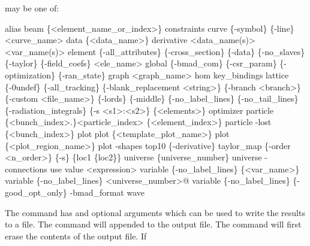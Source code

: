 {{ may be one of:
\begin{example}
   alias
   beam \{<element_name_or_index>\}
   constraints
   curve \{-symbol\} \{-line\} <curve_name> 
   data \{<data_name>\} 
   derivative <data_name(s)> <var_name(s)>
   element \{-all_attributes\} \{-cross_section\} \{-data\} \{-no_slaves\} 
         \{-taylor\} \{-field_coefs\} <ele_name>
   global \{-bmad_com\} \{-csr_param\} \{-optimization\} \{-ran_state\} 
   graph <graph_name>
   hom
   key_bindings
   lattice \{-0undef\} \{-all_tracking\} \{-blank_replacement <string>\} 
         \{-branch <branch>\} \{-custom <file_name>\} \{-lords\} \{-middle\} 
         \{-no_label_lines\} \{-no_tail_lines\} \{-radiation_integrals\}
         \{-s <s1>:<s2>\} \{<elements>\} 
   optimizer
   particle \{<bunch_index>.\}<particle_index> \{<element_index>\}
   particle -lost \{<bunch_index>\}
   plot
   plot \{<template_plot_name>\}
   plot \{<plot_region_name>\}
   plot -shapes
   top10 \{-derivative\}
   taylor_map \{-order <n_order>\} \{-s\} \{loc1 \{loc2\}\}
   universe \{universe_number\}
   universe -connections
   use
   value <expression>
   variable \{-no_label_lines\} \{<var_name>\}
   variable \{-no_label_lines\} <universe_number>@
   variable \{-no_label_lines\} \{-good_opt_only\} -bmad_format
   wave
\end{example}

\vskip 0.2in The  command has  and 
optional arguments which can be used to write the results to a file.
The  command will appended to the output file. The
 command will first erase the contents of the output
file. If \vn{global%
digit number is substituted for the \vn{*}. The value of the number
starts at \vn{001} and increases by 1 each time \vn{show -write} is
used.  Example:
\begin{example}
  show -write orb.dat orbit    ! Write orbit data to the file "orb.dat".
\end{example}

The \vn{-noprint} option suppresses printing and is useful when writing
large amounts of data to a file.

Note: When running \tao as a subprocess, consider using the
\vn{python} command (\sref{s:python}) instead of the \vn{show} command
for communicating with the parent process.


}}}
